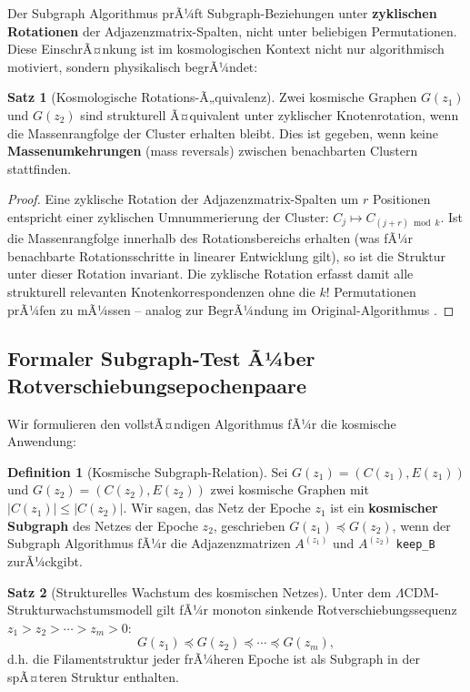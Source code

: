 ﻿\documentclass[a4paper,12pt]{article}
\theoremstyle{definition}
\newtheorem{definition}{Definition}[section]
\newtheorem{satz}{Satz}[section]
\theoremstyle{remark}
\begin{document}
Der Subgraph Algorithmus prÃ¼ft Subgraph-Beziehungen unter \textbf{zyklischen
Rotationen} der Adjazenzmatrix-Spalten, nicht unter beliebigen Permutationen.
Diese EinschrÃ¤nkung ist im kosmologischen Kontext nicht nur algorithmisch
motiviert, sondern physikalisch begrÃ¼ndet:

\begin{satz}[Kosmologische Rotations-Ã„quivalenz]
  \label{satz:rotation_kosmo}
  Zwei kosmische Graphen $G(z_1)$ und $G(z_2)$ sind strukturell Ã¤quivalent
  unter zyklischer Knotenrotation, wenn die Massenrangfolge der Cluster
  erhalten bleibt. Dies ist gegeben, wenn keine
  \textbf{Massenumkehrungen} (mass reversals) zwischen benachbarten
  Clustern stattfinden.
\end{satz}

\begin{proof}
  Eine zyklische Rotation der Adjazenzmatrix-Spalten um $r$ Positionen
  entspricht einer zyklischen Umnummerierung der Cluster:
  $C_j \mapsto C_{(j+r) \bmod k}$. Ist die Massenrangfolge innerhalb
  des Rotationsbereichs erhalten (was fÃ¼r benachbarte Rotationsschritte
  in linearer Entwicklung gilt), so ist die Struktur unter dieser Rotation
  invariant. Die zyklische Rotation erfasst damit alle strukturell
  relevanten Knotenkorrespondenzen ohne die $k!$ Permutationen prÃ¼fen
  zu mÃ¼ssen -- analog zur BegrÃ¼ndung im Original-Algorithmus \cite{eppsubgraph2026}.
\end{proof}

\subsection{Formaler Subgraph-Test Ã¼ber Rotverschiebungsepochenpaare}

Wir formulieren den vollstÃ¤ndigen Algorithmus fÃ¼r die kosmische Anwendung:

\begin{definition}[Kosmische Subgraph-Relation]
  Sei $G(z_1) = (C(z_1), E(z_1))$ und $G(z_2) = (C(z_2), E(z_2))$
  zwei kosmische Graphen mit $|C(z_1)| \leq |C(z_2)|$. Wir sagen,
  das Netz der Epoche $z_1$ ist ein \textbf{kosmischer Subgraph}
  des Netzes der Epoche $z_2$, geschrieben $G(z_1) \preceq G(z_2)$,
  wenn der Subgraph Algorithmus \cite{eppsubgraph2026} fÃ¼r die
  Adjazenzmatrizen $A^{(z_1)}$ und $A^{(z_2)}$ \texttt{keep\_B} zurÃ¼ckgibt.
\end{definition}

\begin{satz}[Strukturelles Wachstum des kosmischen Netzes]
  \label{satz:wachstum}
  Unter dem $\Lambda$CDM-Struktur\-wachstumsmodell gilt fÃ¼r monoton sinkende
  Rotverschiebungssequenz $z_1 > z_2 > \cdots > z_m > 0$:
  \begin{equation}
    G(z_1) \preceq G(z_2) \preceq \cdots \preceq G(z_m),
  \end{equation}
  d.h. die Filamentstruktur jeder frÃ¼heren Epoche ist als Subgraph in der
  spÃ¤teren Struktur enthalten.
\end{satz}
\end{document}
